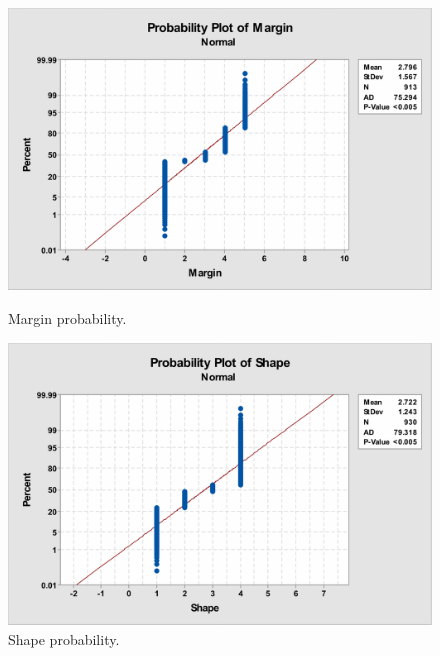 \documentclass[12pt]{article}
\begin{document}
    \begin{figure}[H]
      \centering
      \begin{minipage}[b]{0.45\textwidth}
        \includegraphics[width=\textwidth]{margin-probability}
        \caption{Margin probability.}
        \label{fig:margin-probability}
      \end{minipage}
      \hfill
      \begin{minipage}[b]{0.45\textwidth}
        \includegraphics[width=\textwidth]{shape-probability}
        \caption{Shape probability.}
        \label{fig:shape-probability}
      \end{minipage}
    \end{figure}
\end{document}
